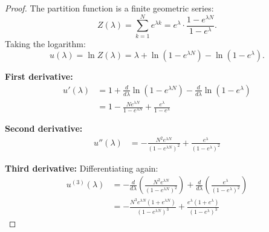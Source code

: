 \documentclass[a4paper, 10pt]{article}
\theoremstyle{definition}
\begin{document}
\begin{proof}
The partition function is a finite geometric series:
\[
Z(\lambda) = \sum_{k=1}^N e^{\lambda k} = e^{\lambda} \cdot \frac{1 - e^{\lambda N}}{1 - e^{\lambda}}.
\]
Taking the logarithm:
\[
u(\lambda) = \ln Z(\lambda) = \lambda + \ln(1 - e^{\lambda N}) - \ln(1 - e^{\lambda}).
\]

\textbf{First derivative:}
\begin{align*}
u'(\lambda) &= 1 + \frac{d}{d\lambda} \ln(1 - e^{\lambda N}) - \frac{d}{d\lambda} \ln(1 - e^{\lambda}) \\
&= 1 - \frac{N e^{\lambda N}}{1 - e^{\lambda N}} + \frac{e^{\lambda}}{1 - e^{\lambda}}
\end{align*}

\textbf{Second derivative:}
\begin{align*}
u''(\lambda)
&= -\frac{N^2 e^{\lambda N}}{(1 - e^{\lambda N})^2} + \frac{e^{\lambda}}{(1 - e^{\lambda})^2}
\end{align*}

\textbf{Third derivative:}
Differentiating again:
\begin{align*}
u^{(3)}(\lambda)
&= -\frac{d}{d\lambda} \left( \frac{N^2 e^{\lambda N}}{(1 - e^{\lambda N})^2} \right)
+ \frac{d}{d\lambda} \left( \frac{e^{\lambda}}{(1 - e^{\lambda})^2} \right) \\
&= -\frac{N^3 e^{\lambda N}(1 + e^{\lambda N})}{(1 - e^{\lambda N})^3} + \frac{e^{\lambda}(1 + e^{\lambda})}{(1 - e^{\lambda})^3}
\end{align*}

\end{proof}
\end{document}
